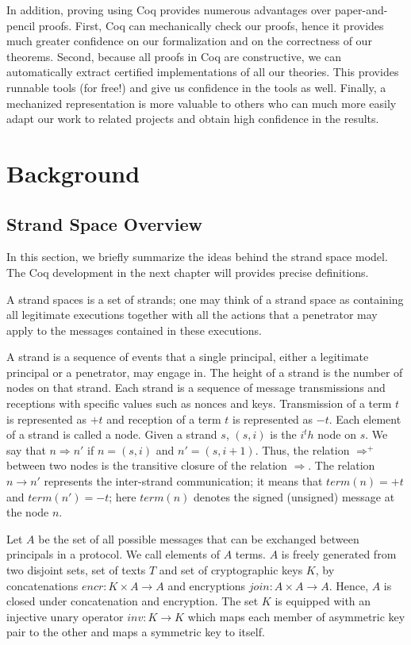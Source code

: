 In addition, proving using Coq provides numerous advantages over paper-and-pencil proofs. First, Coq can mechanically check our proofs, hence it provides much greater confidence on our formalization and on the correctness of our theorems. Second, because all proofs in Coq are constructive, we can automatically extract certified implementations of all our theories. This provides runnable tools (for free!) and give us confidence in the tools as well. Finally, a mechanized representation is more valuable to others who can much more easily
adapt our work to related projects and obtain high confidence in the results.


\chapter{Background}

\section{Strand Space Overview}
In this section, we briefly summarize the ideas behind the strand space model. The Coq development in the next chapter will provides precise definitions.

A strand spaces is a set of strands; one may think of a strand space as containing all legitimate executions together with all the actions that a penetrator may apply to the messages contained in these executions.

A strand is a sequence of events that a single principal, either a legitimate principal or a penetrator, may engage in. The height of a strand is the number of nodes on that strand. Each strand is a sequence of message transmissions and receptions with specific values such as nonces and keys. Transmission of a term $t$ is represented as $+t$ and reception of a term $t$ is represented as $-t$. Each element of a strand is called a node. Given a strand $s$, $(s,i)$ is the $i^th$ node on $s$. We say that $n \Rightarrow n'$ if $n=(s,i)$ and $n'=(s,i+1)$. Thus, the relation $\Rightarrow^+$ between two nodes is the transitive closure of the relation $\Rightarrow$. The relation $n \rightarrow n'$ represents the inter-strand communication; it means that $term(n)=+t$ and $term(n')=-t$; here $term(n)$ denotes the signed (unsigned) message at the node $n$.

Let $A$ be the set of all possible messages that can be exchanged between principals in a protocol. We call elements of $A$ terms. $A$ is freely generated from two disjoint sets, set of texts $T$ and set of cryptographic keys $K$, by concatenations $encr : K \times A \rightarrow A$ and encryptions $join : A \times A \rightarrow A$. Hence, $A$ is closed under concatenation and encryption. The set $K$ is equipped with an injective unary operator $inv : K \rightarrow K$ which maps each member of asymmetric key pair to the other and maps a symmetric key to itself.

